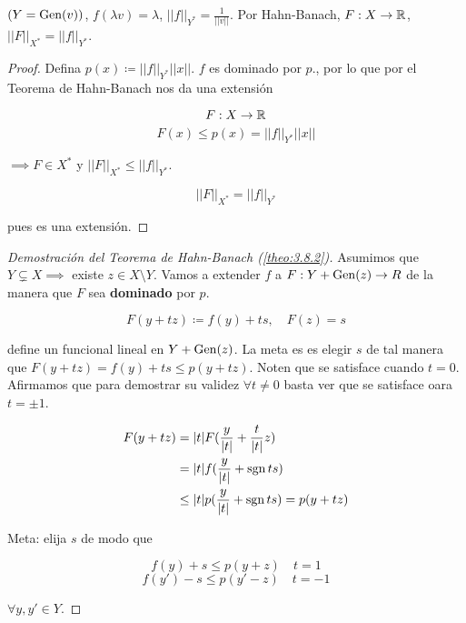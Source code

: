 $(Y=\operatorname{Gen}(v))$, $f(\lambda v)=\lambda$, $||f||_{Y^*}=\frac{1}{||v||}$. Por Hahn-Banach, $F:X\to\mathbb{R}$, $||F||_{X^*}=||f||_{Y^*}$.

\begin{proof}
    Defina $p(x)\coloneqq ||f||_{Y^*}||x||$. $f$ es dominado por $p$., por lo que por el Teorema de Hahn-Banach nos da una extensión 

    \[F:X\to\mathbb{R}\]
    \[F(x)\leq p(x)=||f||_{Y^*}||x||\]

    $\implies F\in X^*$ y $||F||_{X^*}\leq ||f||_{Y^*}$.

    \[||F||_{X^*}=||f||_{Y^*}\]

    pues es una extensión.
\end{proof}

\begin{proof}[Demostración del Teorema de Hahn-Banach (\ref{theo:3.8.2})]
    Asumimos que $Y\subsetneq X\implies $ existe $z\in X\setminus Y$. Vamos a extender $f$ a $F:Y+\operatorname{Gen}(z)\to R$ de la manera que $F$ sea \textbf{dominado} por $p$.

    \[F(y+tz)\coloneqq f(y)+t s,\quad F(z)=s\]

    define un funcional lineal en $Y+\operatorname{Gen}(z)$. La meta es es elegir $s$ de tal manera que $F(y+tz)=f(y)+ts\leq p(y+tz)$. Noten que se satisface cuando $t=0$. Afirmamos que para demostrar su validez $\forall t\neq 0$ basta ver que se satisface oara $t=\pm 1$.

    \begin{align*}
        F(y+tz)&=|t|F(\frac{y}{|t|}+\frac{t}{|t|}z)\\
        &=|t|f(\frac{y}{|t|}+\operatorname{sgn} ts)\\
        &\leq |t| p(\frac{y}{|t|}+\operatorname{sgn} ts)=p(y+tz)
    \end{align*}

    Meta: elija $s$ de modo que 

    \[f(y)+s\leq p(y+z)\quad t=1\]
    \[f(y')-s\leq p(y'-z)\quad t=-1\]

    $\forall y,y'\in Y$.
\end{proof}